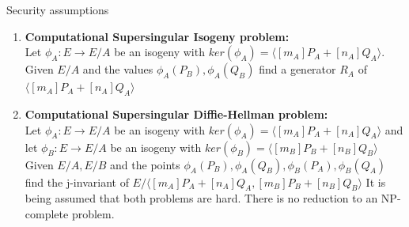 \documentclass[handout]{beamer}
\begin{document}
\begin{frame}{Security assumptions} %
\begin{enumerate}[1.]
	\item \textbf{Computational Supersingular Isogeny problem:}\\
	Let $\phi_A:E\to E/A$ be an isogeny with $ker(\phi_A)=\langle [m_A]P_A+[n_A]Q_A\rangle$. Given $E/A$ and the values $\phi_A(P_B),\phi_A(Q_B)$ find a generator $R_A$ of $\langle [m_A]P_A+[n_A]Q_A\rangle$\pause
	\vspace{5mm}
	\item \textbf{Computational Supersingular Diffie-Hellman problem:}\\ 
	Let $\phi_A:E\to E/A$ be an isogeny with $ker(\phi_A)=\langle [m_A]P_A+[n_A]Q_A\rangle$ and let $\phi_B:E\to E/A$ be an isogeny with $ker(\phi_B)=\langle [m_B]P_B+[n_B]Q_B\rangle$
	Given $E/A,E/B$ and the points $\phi_A(P_B),\phi_A(Q_B),\phi_B(P_A),\phi_B(Q_A)$ find the j-invariant of $E/\langle [m_A]P_A+[n_A]Q_A,[m_B]P_B+[n_B]Q_B \rangle$\pause
	\vfill
	It is being assumed that both problems are hard. There is no reduction to an NP-complete problem.
\end{enumerate}
\end{frame}
\end{document}
